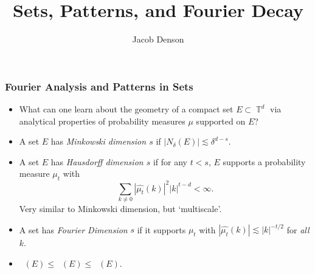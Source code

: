 \documentclass[handout,usenames,dvipsnames]{beamer}
\title{Sets, Patterns, and Fourier Decay}
\author{Jacob Denson}
\institute{}
\DeclareMathOperator{\TT}{\mathbb{T}}
\DeclareMathOperator{\fordim}{\text{dim}_{\mathbb{F}}}
\DeclareMathOperator{\hausdim}{\text{dim}_{\mathbb{H}}}
\DeclareMathOperator{\minkdim}{\text{dim}_{\mathbb{M}}}
\begin{document}
\maketitle

\begin{frame}
    \frametitle{Fourier Analysis and Patterns in Sets}

    \begin{itemize}
        \item What can one learn about the geometry of a compact set $E \subset \TT^d$ via analytical properties of probability measures $\mu$ supported on $E$?
        \pause

        \item A set $E$ has \emph{Minkowski dimension $s$} if $|N_\delta(E)| \lesssim \delta^{d-s}$.
        \pause

        \item A set $E$ has \emph{Hausdorff dimension $s$} if for any $t < s$, $E$ supports a probability measure $\mu_t$ with
        \[ \sum_{k \neq 0} |\widehat{\mu_t}(k)|^2 |k|^{t-d} < \infty. \]
        Very similar to Minkowski dimension, but `multiscale'.
        \pause

        \item A set has \emph{Fourier Dimension} $s$ if it supports $\mu_t$ with $|\widehat{\mu_t}(k)| \lesssim |k|^{-t/2}$ for \emph{all} $k$.

        \item $\fordim(E) \leq \hausdim(E) \leq \minkdim(E)$.
    \end{itemize}
\end{frame}
\end{document}

